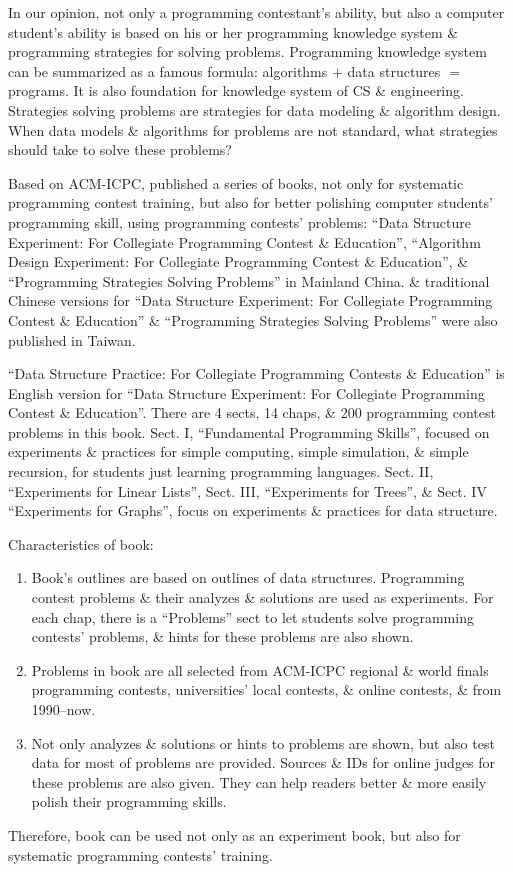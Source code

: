 \documentclass{article}
\begin{document}
\begin{itemize}
	In our opinion, not only a programming contestant's ability, but also a computer student's ability is based on his or her programming knowledge system \& programming strategies for solving problems. Programming knowledge system can be summarized as a famous formula: algorithms $+$ data structures $=$ programs. It is also foundation for knowledge system of CS \& engineering. Strategies solving problems are strategies for data modeling \& algorithm design. When data models \& algorithms for problems are not standard, what strategies should take to solve these problems?
	
	Based on ACM-ICPC, published a series of books, not only for systematic programming contest training, but also for better polishing computer students' programming skill, using programming contests' problems: ``Data Structure Experiment: For Collegiate Programming Contest \& Education'', ``Algorithm Design Experiment: For Collegiate Programming Contest \& Education'', \& ``Programming Strategies Solving Problems'' in Mainland China. \& traditional Chinese versions for ``Data Structure Experiment: For Collegiate Programming Contest \& Education'' \& ``Programming Strategies Solving Problems'' were also published in Taiwan.
	
	``Data Structure Practice: For Collegiate Programming Contests \& Education'' is English version for ``Data Structure Experiment: For Collegiate Programming Contest \& Education''. There are 4 sects, 14 chaps, \& 200 programming contest problems in this book. Sect. I, ``Fundamental Programming Skills'', focused on experiments \& practices for simple computing, simple simulation, \& simple recursion, for students just learning programming languages. Sect. II, ``Experiments for Linear Lists'', Sect. III, ``Experiments for Trees'', \& Sect. IV ``Experiments for Graphs'', focus on experiments \& practices for data structure.
	
	Characteristics of book:
	\begin{enumerate}
		\item Book's outlines are based on outlines of data structures. Programming contest problems \& their analyzes \& solutions are used as experiments. For each chap, there is a ``Problems'' sect to let students solve programming contests' problems, \& hints for these problems are also shown.
		\item Problems in book are all selected from ACM-ICPC regional \& world finals programming contests, universities' local contests, \& online contests, \& from 1990--now.
		\item Not only analyzes \& solutions or hints to problems are shown, but also test data for most of problems are provided. Sources \& IDs for online judges for these problems are also given. They can help readers better \& more easily polish their programming skills.
	\end{enumerate}
	Therefore, book can be used not only as an experiment book, but also for systematic programming contests' training.
	

\end{itemize}
\end{document}
